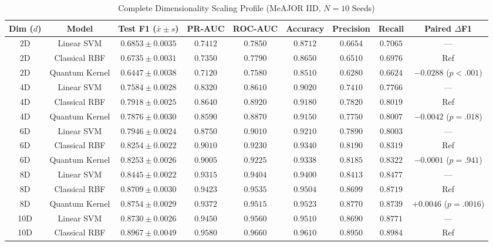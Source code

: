 \documentclass[10pt,letterpaper]{article}
\begin{document}
\begin{table}[h!]
\centering
\small
\caption{Complete Dimensionality Scaling Profile (MeAJOR IID, $N=10$ Seeds)}
\label{tab:supp_dim_sweep_detail}
\begin{tabular}{ccccccccc}
\toprule
\textbf{Dim ($d$)} & \textbf{Model} & \textbf{Test F1 ($\bar{x} \pm s$)} & \textbf{PR-AUC} & \textbf{ROC-AUC} & \textbf{Accuracy} & \textbf{Precision} & \textbf{Recall} & \textbf{Paired $\Delta$F1} \\
\midrule
2D & Linear SVM & $0.6853 \pm 0.0035$ & $0.7412$ & $0.7850$ & $0.8712$ & $0.6654$ & $0.7065$ & — \\
2D & Classical RBF & $0.6735 \pm 0.0031$ & $0.7350$ & $0.7790$ & $0.8650$ & $0.6510$ & $0.6976$ & Ref \\
2D & Quantum Kernel & $0.6447 \pm 0.0038$ & $0.7120$ & $0.7580$ & $0.8510$ & $0.6280$ & $0.6624$ & $-0.0288$ ($p < .001$) \\
\midrule
4D & Linear SVM & $0.7584 \pm 0.0028$ & $0.8320$ & $0.8610$ & $0.9020$ & $0.7410$ & $0.7766$ & — \\
4D & Classical RBF & $0.7918 \pm 0.0025$ & $0.8640$ & $0.8920$ & $0.9180$ & $0.7820$ & $0.8019$ & Ref \\
4D & Quantum Kernel & $0.7876 \pm 0.0030$ & $0.8590$ & $0.8870$ & $0.9150$ & $0.7750$ & $0.8007$ & $-0.0042$ ($p = .018$) \\
\midrule
6D & Linear SVM & $0.7946 \pm 0.0024$ & $0.8750$ & $0.9010$ & $0.9210$ & $0.7890$ & $0.8003$ & — \\
6D & Classical RBF & $0.8254 \pm 0.0022$ & $0.9010$ & $0.9230$ & $0.9340$ & $0.8190$ & $0.8319$ & Ref \\
6D & Quantum Kernel & $0.8253 \pm 0.0026$ & $0.9005$ & $0.9225$ & $0.9338$ & $0.8185$ & $0.8322$ & $-0.0001$ ($p = .941$) \\
\midrule
8D & Linear SVM & $0.8445 \pm 0.0022$ & $0.9315$ & $0.9404$ & $0.9400$ & $0.8413$ & $0.8477$ & — \\
8D & Classical RBF & $0.8709 \pm 0.0030$ & $0.9423$ & $0.9535$ & $0.9504$ & $0.8699$ & $0.8719$ & Ref \\
8D & Quantum Kernel & $0.8754 \pm 0.0029$ & $0.9372$ & $0.9515$ & $0.9523$ & $0.8770$ & $0.8739$ & $+0.0046$ ($p = .0016$) \\
\midrule
10D & Linear SVM & $0.8730 \pm 0.0026$ & $0.9450$ & $0.9560$ & $0.9510$ & $0.8690$ & $0.8771$ & — \\
10D & Classical RBF & $0.8967 \pm 0.0049$ & $0.9580$ & $0.9660$ & $0.9610$ & $0.8950$ & $0.8984$ & Ref \\

\end{tabular}
\end{table}
\end{document}
